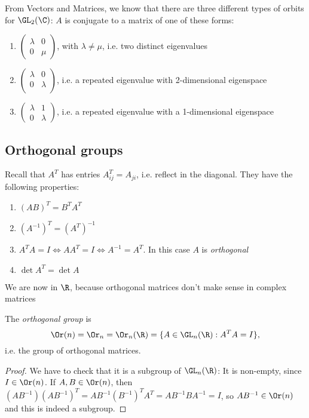 \documentclass[a4pape]{article}
\begin{document}
From Vectors and Matrices, we know that there are three different types of orbits for $\GL_2(\C)$: $A$ is conjugate to a matrix of one of these forms:
\begin{enumerate}
\item $
\begin{pmatrix}
  \lambda & 0\\
  0 & \mu
\end{pmatrix}
$, with $\lambda \not= \mu$, i.e. two distinct eigenvalues
\item $
  \begin{pmatrix}
    \lambda & 0\\
    0 & \lambda\\
  \end{pmatrix}$, i.e. a repeated eigenvalue with 2-dimensional eigenspace
\item $
  \begin{pmatrix}
    \lambda & 1\\
    0 & \lambda
  \end{pmatrix}$, i.e. a repeated eigenvalue with a 1-dimensional eigenspace
\end{enumerate}
\subsection{Orthogonal groups}
Recall that $A^T$ has entries $A^{T}_{ij} = A_{ji}$, i.e. reflect in the diagonal. They have the following properties:
\begin{enumerate}
\item $(AB)^T = B^TA^T$
\item $(A^{-1})^T = (A^T)^{-1}$
\item $A^{T}A = I\Leftrightarrow AA^{T} = I\Leftrightarrow A^{-1} = A^{T}$. In this case $A$ is \emph{orthogonal}
\item $\det A^{T} = \det A$
\end{enumerate}
\note We are now in $\R$, because orthogonal matrices don't make sense in complex matrices

\begin{defi}
  The \emph{orthogonal group} is 
  \[
  \Or(n) = \Or_n = \Or_n(\R) = \{A\in \GL_n(\R): A^TA = I\},
  \]
i.e. the group of orthogonal matrices.
\end{defi}

\begin{proof}
  We have to check that it is a subgroup of $\GL_n(\R)$: It is non-empty, since $I\in \Or(n)$. If $A, B\in \Or(n)$, then $(AB^{-1})(AB^{-1})^T = AB^{-1}(B^{-1})^TA^{T} = AB^{-1}BA^{-1} = I$, so $AB^{-1}\in \Or(n)$ and this is indeed a subgroup.
\end{proof}
\end{document}
